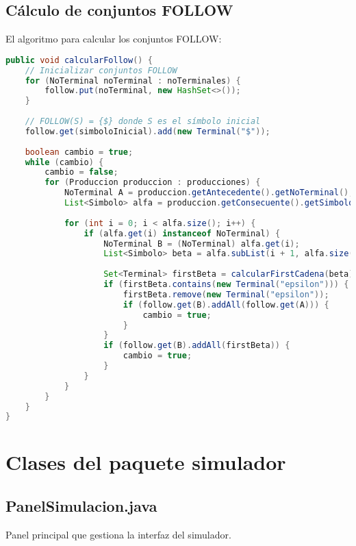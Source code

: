 \subsection{Cálculo de conjuntos FOLLOW}

El algoritmo para calcular los conjuntos FOLLOW:

\begin{lstlisting}[language=Java, caption=Algoritmo de cálculo de conjuntos FOLLOW]
public void calcularFollow() {
    // Inicializar conjuntos FOLLOW
    for (NoTerminal noTerminal : noTerminales) {
        follow.put(noTerminal, new HashSet<>());
    }
    
    // FOLLOW(S) = {$} donde S es el símbolo inicial
    follow.get(simboloInicial).add(new Terminal("$"));
    
    boolean cambio = true;
    while (cambio) {
        cambio = false;
        for (Produccion produccion : producciones) {
            NoTerminal A = produccion.getAntecedente().getNoTerminal();
            List<Simbolo> alfa = produccion.getConsecuente().getSimbolos();
            
            for (int i = 0; i < alfa.size(); i++) {
                if (alfa.get(i) instanceof NoTerminal) {
                    NoTerminal B = (NoTerminal) alfa.get(i);
                    List<Simbolo> beta = alfa.subList(i + 1, alfa.size());
                    
                    Set<Terminal> firstBeta = calcularFirstCadena(beta);
                    if (firstBeta.contains(new Terminal("epsilon"))) {
                        firstBeta.remove(new Terminal("epsilon"));
                        if (follow.get(B).addAll(follow.get(A))) {
                            cambio = true;
                        }
                    }
                    if (follow.get(B).addAll(firstBeta)) {
                        cambio = true;
                    }
                }
            }
        }
    }
}
\end{lstlisting}

\section{Clases del paquete simulador}

\subsection{PanelSimulacion.java}

Panel principal que gestiona la interfaz del simulador.

